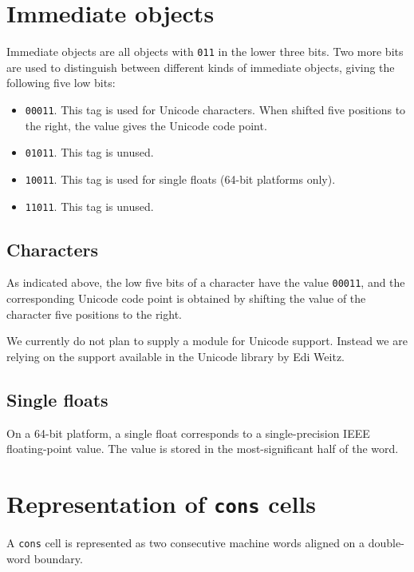 \section{Immediate objects}
\label{sec-data-representation-immediate-objects}

Immediate objects are all objects with \texttt{011} in the lower three
bits.  Two more bits are used to distinguish between different kinds
of immediate objects, giving the following five low bits:

\begin{itemize}
\item \texttt{00011}.  This tag is used for Unicode characters.  When
  shifted five positions to the right, the value gives the Unicode
  code point.
\item \texttt{01011}.  This tag is unused.
\item \texttt{10011}.  This tag is used for single floats (64-bit
  platforms only).
\item \texttt{11011}.  This tag is unused.
\end{itemize}

\subsection{Characters}

As indicated above, the low five bits of a character have the value
\texttt{00011}, and the corresponding Unicode code point is obtained by
shifting the value of the character five positions to the right.

We currently do not plan to supply a module for Unicode support.
Instead we are relying on the support available in the Unicode library
by Edi Weitz.

\subsection{Single floats}

On a 64-bit platform, a single float corresponds to a single-precision
IEEE floating-point value.  The value is stored in the
most-significant half of the word.

\section{Representation of \texttt{cons} cells}
\label{sec-data-representation-cons-cells}

A \texttt{cons} cell is represented as two consecutive machine
words aligned on a double-word boundary.

